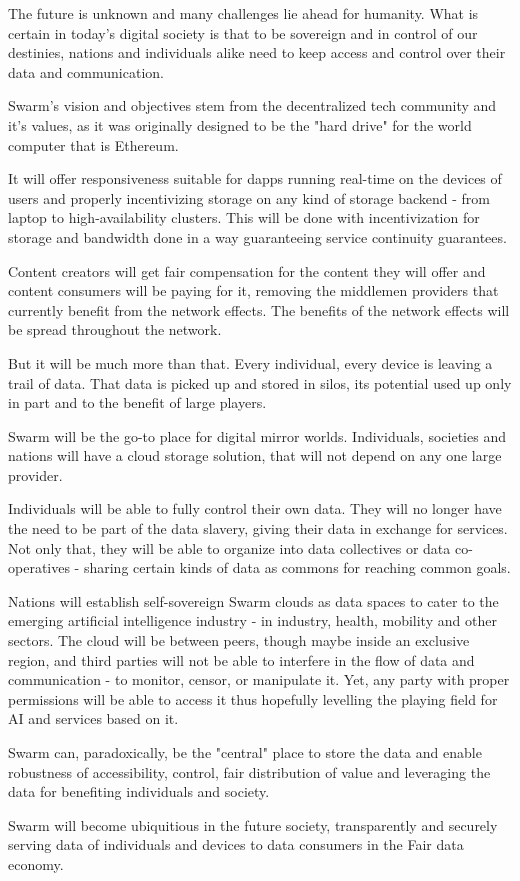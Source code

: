 The future is unknown and many challenges lie ahead for humanity. What is certain in today's digital society is that to be sovereign and in control of our destinies, nations and individuals alike need to keep access and control over their data and communication.

Swarm's vision and objectives stem from the decentralized tech community and it's values, as it was originally designed to be the "hard drive" for the world computer that is Ethereum.

It will offer responsiveness suitable for dapps running real-time on the devices of users and properly incentivizing storage on any kind of storage backend - from laptop to high-availability clusters. This will be done with incentivization for storage and bandwidth done in a way guaranteeing service continuity guarantees.

Content creators will get fair compensation for the content they will offer and content consumers will be paying for it, removing the middlemen providers that currently benefit from the network effects. The benefits of the network effects will be spread throughout the network.

But it will be much more than that. Every individual, every device is leaving a trail of data. That data is picked up and stored in silos, its potential used up only in part and to the benefit of large players.

Swarm will be the go-to place for digital mirror worlds. Individuals, societies and nations will have a cloud storage solution, that will not depend on any one large provider. 


Individuals will be able to fully control their own data. They will no longer have the need to be part of the data slavery, giving their data in exchange for services. Not only that, they will be able to organize into data collectives or data co-operatives - sharing certain kinds of data as commons for reaching common goals. 

Nations will establish self-sovereign Swarm clouds as data spaces to cater to the emerging artificial intelligence industry - in industry, health, mobility and other sectors. The cloud will be between peers, though maybe inside an exclusive region, and third parties will not be able to interfere in the flow of data and communication - to monitor, censor,  or manipulate it. Yet, any party with proper permissions will be able to access it thus hopefully levelling the playing field for AI and services based on it.  

Swarm can, paradoxically, be the "central" place to store the data and enable robustness of accessibility, control, fair distribution of value and leveraging the data for benefiting individuals and society.

Swarm will become ubiquitious in the future society, transparently and securely serving data of individuals and devices to data consumers in the Fair data economy.

